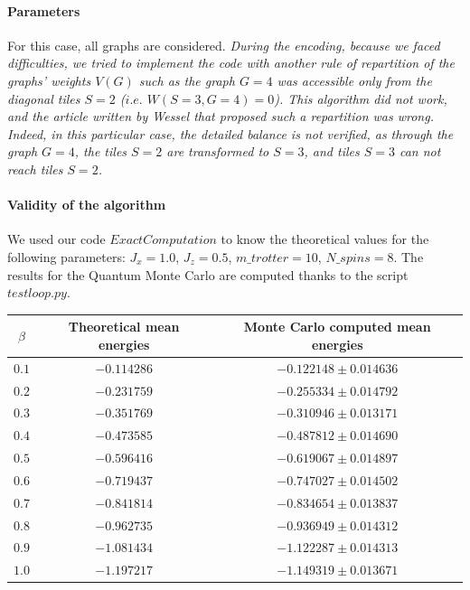 \documentclass[a4paper,12pt,twoside]{article}
\begin{document}
	\paragraph{Parameters} For this case, all graphs are considered.
	\emph{During the encoding, because we faced difficulties, we tried to implement the code with another rule of repartition of the graphs' weights $V(G)$ such as the graph $G = 4$ was accessible only from the diagonal tiles $S = 2$ ($i.e.$ $W(S=3, G=4)=0$). This algorithm did not work, and the article written by Wessel that proposed such a repartition was wrong. Indeed, in this particular case, the detailed balance is not verified, as through the graph $G=4$, the tiles $S=2$ are transformed to $S=3$, and tiles $S=3$ can not reach tiles $S=2$.}
	
	\paragraph{Validity of the algorithm} We used our code $ExactComputation$ to know the theoretical values for the following parameters: $J_x = 1.0$, $J_z = 0.5$,  $m\_trotter = 10$,  $N\_spins = 8$. The results for the Quantum Monte Carlo are computed thanks to the script $testloop.py$. \\
	\begin{tabular}[c]{| c || c | c |}
		\hline            
		$\beta$ & Theoretical mean energies & Monte Carlo computed mean energies \\ \hline
		$0.1$ & $-0.114286$ & $-0.122148 \pm 0.014636$ \\ \hline
		$0.2$ & $-0.231759$ & $-0.255334 \pm 0.014792$ \\ \hline
		$0.3$ & $-0.351769$ & $-0.310946 \pm 0.013171$ \\ \hline
		$0.4$ & $-0.473585$ & $-0.487812 \pm 0.014690$ \\ \hline
		$0.5$ & $-0.596416$ & $-0.619067 \pm 0.014897$ \\ \hline
		$0.6$ & $-0.719437$ & $-0.747027 \pm 0.014502$ \\ \hline
		$0.7$ & $-0.841814$ & $-0.834654 \pm 0.013837$ \\ \hline
		$0.8$ & $-0.962735$ & $-0.936949 \pm 0.014312$ \\ \hline
		$0.9$ & $-1.081434$ & $-1.122287 \pm 0.014313$ \\ \hline
		$1.0$ & $-1.197217$ & $-1.149319 \pm 0.013671$ \\ \hline
	\end{tabular} 
	
\end{document}
